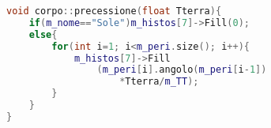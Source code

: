 \begin{lstlisting}[language=C++]
void corpo::precessione(float Tterra){
    if(m_nome=="Sole")m_histos[7]->Fill(0);
    else{
        for(int i=1; i<m_peri.size(); i++){
            m_histos[7]->Fill
                (m_peri[i].angolo(m_peri[i-1])
                    *Tterra/m_TT);
        }
    }
}
\end{lstlisting}
